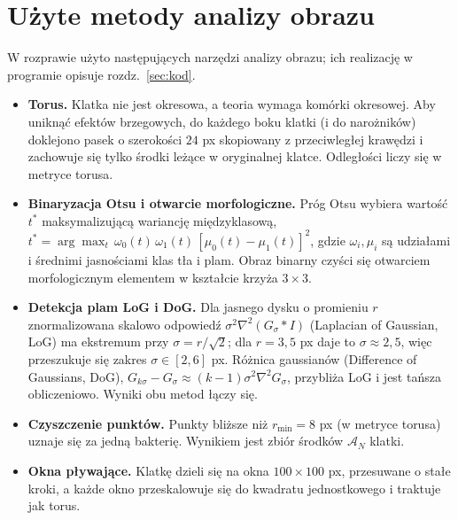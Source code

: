 \documentclass[12pt,a4paper,twoside,openright]{report}
\theoremstyle{definition}
\theoremstyle{remark}
\begin{document}
{\section{Użyte metody analizy obrazu}
W rozprawie użyto następujących narzędzi analizy obrazu; ich realizację w programie opisuje rozdz.~\ref{sec:kod}.
\begin{itemize}[nosep]
\item \textbf{Torus.} Klatka nie jest okresowa, a teoria wymaga komórki okresowej. Aby uniknąć efektów brzegowych, do każdego boku klatki (i do narożników) doklejono pasek o szerokości $24$ px skopiowany z przeciwległej krawędzi i zachowuje się tylko środki leżące w oryginalnej klatce. Odległości liczy się w metryce torusa.
\item \textbf{Binaryzacja Otsu i otwarcie morfologiczne.} Próg Otsu wybiera wartość $t^*$ maksymalizującą wariancję międzyklasową, $t^*=\arg\max_t\,\omega_0(t)\,\omega_1(t)\,[\mu_0(t)-\mu_1(t)]^2$, gdzie $\omega_i,\mu_i$ są udziałami i średnimi jasnościami klas tła i plam. Obraz binarny czyści się otwarciem morfologicznym elementem w kształcie krzyża $3\times3$.
\item \textbf{Detekcja plam LoG i DoG.} Dla jasnego dysku o promieniu $r$ znormalizowana skalowo odpowiedź $\sigma^2\nabla^2(G_\sigma*I)$ (Laplacian of Gaussian, LoG) ma ekstremum przy $\sigma=r/\sqrt2$; dla $r=3{,}5$ px daje to $\sigma\approx2{,}5$, więc przeszukuje się zakres $\sigma\in[2,6]$ px. Różnica gaussianów (Difference of Gaussians, DoG), $G_{k\sigma}-G_\sigma\approx(k-1)\sigma^2\nabla^2G_\sigma$, przybliża LoG i jest tańsza obliczeniowo. Wyniki obu metod łączy się.
\item \textbf{Czyszczenie punktów.} Punkty bliższe niż $r_{\min}=8$ px (w metryce torusa) uznaje się za jedną bakterię. Wynikiem jest zbiór środków $\mathcal A_N$ klatki.
\item \textbf{Okna pływające.} Klatkę dzieli się na okna $100\times100$ px, przesuwane o stałe kroki, a każde okno przeskalowuje się do kwadratu jednostkowego i traktuje jak torus.
\end{itemize}

}
\end{document}
